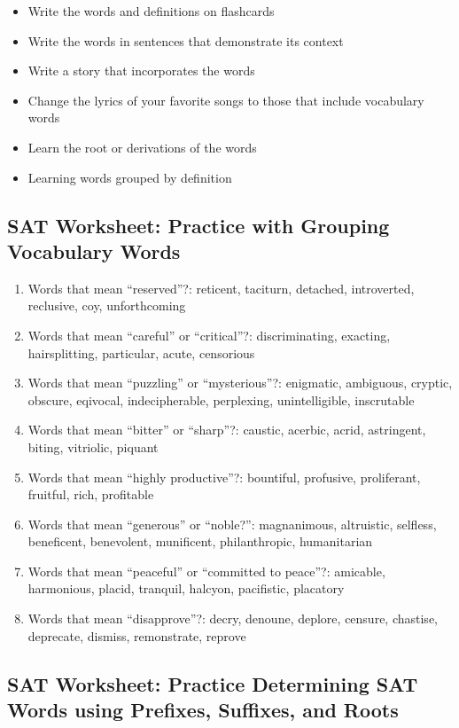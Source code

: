 \begin{enumerate}
\begin{itemize}
\item Write the words and definitions on flashcards
\item Write the words in sentences that demonstrate its context
\item Write a story that incorporates the words 
\item Change the lyrics of your favorite songs to those that include vocabulary words
\item Learn the root or derivations of the words
\item Learning words grouped by definition
\end{itemize}

\subsection{SAT Worksheet: Practice with Grouping Vocabulary Words}

\begin{enumerate}
\item Words that mean ``reserved''?: reticent, taciturn, detached, introverted, reclusive, coy, unforthcoming
\item Words that mean ``careful'' or ``critical''?: discriminating, exacting, hairsplitting, particular, acute, censorious
\item Words that mean ``puzzling'' or ``mysterious''?: enigmatic, ambiguous, cryptic, obscure, eqivocal, indecipherable, perplexing, unintelligible, inscrutable
\item Words that mean ``bitter'' or ``sharp''?: caustic, acerbic, acrid, astringent, biting, vitriolic, piquant
\item Words that mean ``highly productive''?: bountiful, profusive, proliferant, fruitful, rich, profitable
\item Words that mean ``generous'' or ``noble?'': magnanimous, altruistic, selfless, beneficent, benevolent, munificent, philanthropic, humanitarian
\item Words that mean ``peaceful'' or ``committed to peace''?: amicable, harmonious, placid, tranquil, halcyon, pacifistic, placatory
\item Words that mean ``disapprove''?: decry, denoune, deplore, censure, chastise, deprecate, dismiss, remonstrate, reprove
\end{enumerate}

\subsection{SAT Worksheet: Practice Determining SAT Words using Prefixes, Suffixes, and Roots}


\end{enumerate}
